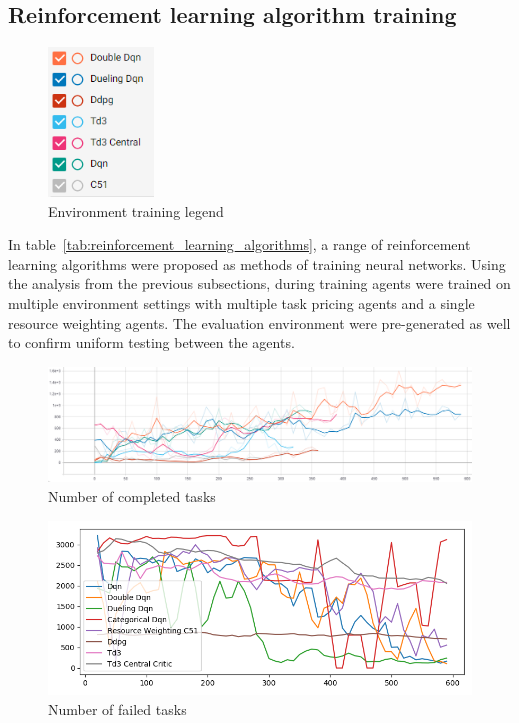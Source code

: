 \subsection{Reinforcement learning algorithm training}\label{subsec:reinforcement-learning-algorithm-training}

\begin{figure}
    \includegraphics[width=0.25\textwidth]{figures/5_evaluation_figs/algo_training_fig/legend.PNG}
    \caption{Environment training legend}
    \label{fig:algo-training-legend}
\end{figure}

In table~\ref{tab:reinforcement_learning_algorithms}, a range of reinforcement learning algorithms were proposed as
methods of training neural networks. Using the analysis from the previous subsections, during training agents were
trained on multiple environment settings with multiple task pricing agents and a single resource weighting agents.
The evaluation environment were pre-generated as well to confirm uniform testing between the agents. \\

\begin{figure}[H]
    \centering
    \includegraphics[width=\linewidth]{figures/5_evaluation_figs/algo_training_fig/num_completed_tasks.PNG}
    \caption{Number of completed tasks}
    \label{fig:algo_num_completed_tasks}
\end{figure}

\begin{figure}[H]
    \centering
    \includegraphics[width=\linewidth]{figures/5_evaluation_figs/algo_training_fig/num_failed_tasks.png}
    \caption{Number of failed tasks}
    \label{fig:algo_num_failed_tasks}
\end{figure}

